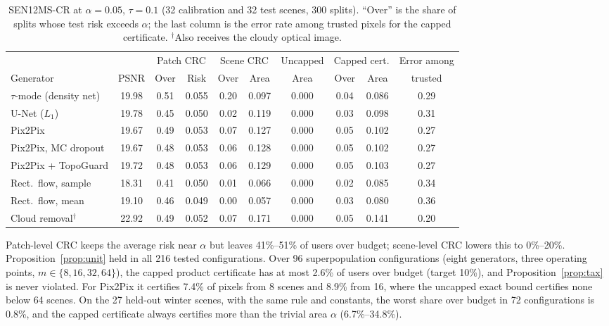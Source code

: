 \documentclass[11pt,a4paper]{article}
\theoremstyle{definition}
\theoremstyle{remark}
\newcommand{\1}{\mathbf{1}}
\begin{document}
\begin{table}[htbp]
\centering
\caption{SEN12MS-CR at $\alpha=0.05$, $\tau=0.1$ (32 calibration and 32 test scenes, 300 splits). ``Over'' is the share of splits whose test risk exceeds $\alpha$; the last column is the error rate among trusted pixels for the capped certificate. $^\dagger$Also receives the cloudy optical image.}
\label{tab:main}
\small\setlength{\tabcolsep}{3.6pt}
\begin{tabular}{@{}lccccccccc@{}}
\toprule
 & & \multicolumn{2}{c}{Patch CRC} & \multicolumn{2}{c}{Scene CRC} & Uncapped & \multicolumn{2}{c}{Capped cert.} & Error among\\
\cmidrule(lr){3-4}\cmidrule(lr){5-6}\cmidrule(lr){7-7}\cmidrule(lr){8-9}
Generator & PSNR & Over & Risk & Over & Area & Area & Over & Area & trusted\\
\midrule
$\tau$-mode (density net) & 19.98 & 0.51 & 0.055 & 0.20 & 0.097 & 0.000 & 0.04 & 0.086 & 0.29\\
U-Net ($L_1$) & 19.78 & 0.45 & 0.050 & 0.02 & 0.119 & 0.000 & 0.03 & 0.098 & 0.31\\
Pix2Pix & 19.67 & 0.49 & 0.053 & 0.07 & 0.127 & 0.000 & 0.05 & 0.102 & 0.27\\
Pix2Pix, MC dropout & 19.67 & 0.48 & 0.053 & 0.06 & 0.128 & 0.000 & 0.05 & 0.102 & 0.27\\
Pix2Pix + TopoGuard & 19.72 & 0.48 & 0.053 & 0.06 & 0.129 & 0.000 & 0.05 & 0.103 & 0.27\\
Rect.\ flow, sample & 18.31 & 0.41 & 0.050 & 0.01 & 0.066 & 0.000 & 0.02 & 0.085 & 0.34\\
Rect.\ flow, mean & 19.10 & 0.46 & 0.049 & 0.00 & 0.057 & 0.000 & 0.03 & 0.080 & 0.36\\
Cloud removal$^\dagger$ & 22.92 & 0.49 & 0.052 & 0.07 & 0.171 & 0.000 & 0.05 & 0.141 & 0.20\\
\bottomrule
\end{tabular}
\end{table}

Patch-level CRC keeps the average risk near $\alpha$ but leaves 41\%--51\% of users over budget; scene-level CRC lowers this to 0\%--20\%. Proposition~\ref{prop:unit} held in all 216 tested configurations. Over 96 superpopulation configurations (eight generators, three operating points, $m\in\{8,16,32,64\}$), the capped product certificate has at most 2.6\% of users over budget (target 10\%), and Proposition~\ref{prop:tax} is never violated. For Pix2Pix it certifies 7.4\% of pixels from 8 scenes and 8.9\% from 16, where the uncapped exact bound certifies none below 64 scenes. On the 27 held-out winter scenes, with the same rule and constants, the worst share over budget in 72 configurations is 0.8\%, and the capped certificate always certifies more than the trivial area $\alpha$ (6.7\%--34.8\%).
\end{document}
